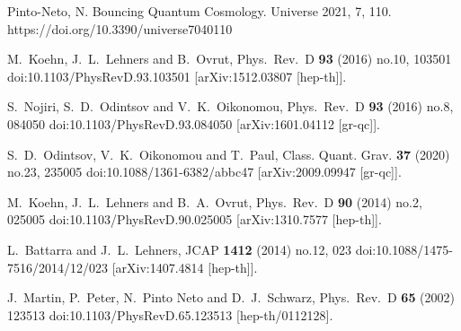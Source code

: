\documentclass{article}
\begin{document}
\begin{thebibliography}{99}
Pinto-Neto, N. Bouncing Quantum Cosmology. Universe 2021, 7, 110. https://doi.org/10.3390/universe7040110




M.~Koehn, J.~L.~Lehners and B.~Ovrut,
Phys.\ Rev.\ D {\bf 93} (2016) no.10, 103501
doi:10.1103/PhysRevD.93.103501
[arXiv:1512.03807 [hep-th]].




S.~Nojiri, S.~D.~Odintsov and V.~K.~Oikonomou,
Phys.\ Rev.\ D {\bf 93} (2016) no.8, 084050
doi:10.1103/PhysRevD.93.084050
[arXiv:1601.04112 [gr-qc]].




S.~D.~Odintsov, V.~K.~Oikonomou and T.~Paul,
Class. Quant. Grav. \textbf{37} (2020) no.23, 235005
doi:10.1088/1361-6382/abbc47
[arXiv:2009.09947 [gr-qc]].





M.~Koehn, J.~L.~Lehners and B.~A.~Ovrut,
Phys.\ Rev.\ D {\bf 90} (2014) no.2, 025005
doi:10.1103/PhysRevD.90.025005
[arXiv:1310.7577 [hep-th]].



L.~Battarra and J.~L.~Lehners,
JCAP {\bf 1412} (2014) no.12, 023
doi:10.1088/1475-7516/2014/12/023
[arXiv:1407.4814 [hep-th]].


J.~Martin, P.~Peter, N.~Pinto Neto and D.~J.~Schwarz,
Phys.\ Rev.\ D {\bf 65} (2002) 123513
doi:10.1103/PhysRevD.65.123513
[hep-th/0112128].



\end{thebibliography}
\end{document}
